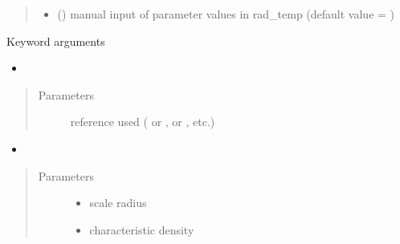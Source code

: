 \documentclass[letterpaper,10pt,english]{sphinxmanual}
\begin{document}
\begin{fulllineitems}
\begin{quote}
\begin{description}
\begin{itemize}
\item {} 
\sphinxAtStartPar
{} () \textendash{} manual input of parameter values in rad\_temp (default value = )

\end{itemize}

\end{description}\end{quote}

\sphinxAtStartPar
Keyword arguments
\begin{itemize}
\item {} 
\sphinxAtStartPar
{}

\end{itemize}
\begin{quote}\begin{description}
\item[{Parameters}] \leavevmode
\sphinxAtStartPar
{} \textendash{} reference used ( or \sphinxcode{\sphinxupquote{\textquotesingle{}1309.2641\textquotesingle{}}},  or \sphinxcode{\sphinxupquote{\textquotesingle{}1408.0002\textquotesingle{}}}, etc.)

\end{description}\end{quote}
\begin{itemize}
\item {} 
\sphinxAtStartPar
{}

\end{itemize}
\begin{quote}\begin{description}
\item[{Parameters}] \leavevmode\begin{itemize}
\item {} 
\sphinxAtStartPar
{} \textendash{} scale radius

\item {} 
\sphinxAtStartPar
{} \textendash{} characteristic density


\end{itemize}
\end{description}
\end{quote}
\end{fulllineitems}
\end{document}
